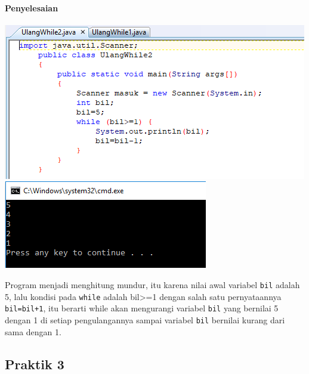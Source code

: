 \documentclass[a4paper,12pt]{article}
\begin{document}
\paragraph{Penyelesaian\\}
\begin{center}
	\includegraphics[width=\linewidth]{Capture4}
	\includegraphics[scale=1]{Capture5}
\end{center}
Program menjadi menghitung mundur, itu karena nilai awal variabel \texttt{bil} adalah 5, lalu kondisi pada \texttt{while} adalah bil>=1 dengan salah satu pernyataannya \texttt{bil=bil+1}, itu berarti while akan mengurangi variabel \texttt{bil} yang bernilai 5 dengan 1 di setiap pengulangannya sampai variabel \texttt{bil} bernilai kurang dari sama dengan 1. 

\subsection{Praktik 3}
\end{document}
